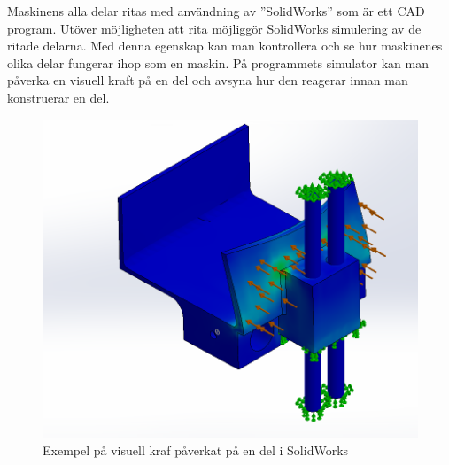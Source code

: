 Maskinens alla delar ritas med användning av ”SolidWorks” som är ett CAD program. Utöver möjligheten att rita möjliggör SolidWorks simulering av de ritade delarna. Med denna egenskap kan man kontrollera och se hur maskinenes olika delar fungerar ihop som en maskin. På programmets simulator kan man påverka en visuell kraft på en del och avsyna hur den reagerar innan man konstruerar en del.
\begin{figure}[ht]
	\begin{center}
		\includegraphics[scale=0.8]{images/hissEdited.png}
		\caption{Exempel på visuell kraf påverkat på en del i SolidWorks}
		\label{simulering}	
	\end{center}
\end{figure}